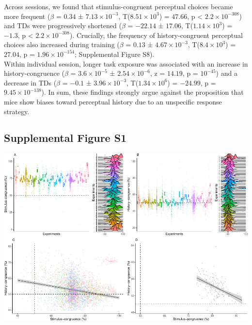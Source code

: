 \documentclass[
]{article}
\begin{document}
Across sessions, we found that stimulus-congruent perceptual choices
became more frequent (\(\beta\) = \(0.34\) ±
\(\ensuremath{7.13\times 10^{-3}}\),
T(\(\ensuremath{8.51\times 10^{3}}\)) = \(47.66\), p < \(\ensuremath{2.2\times 10^{-308}}\)) and TDs
were progressively shortened (\(\beta\) = \(-22.14\) ± \(17.06\),
T(\(\ensuremath{1.14\times 10^{3}}\)) = \(-1.3\), p < \(\ensuremath{2.2\times 10^{-308}}\)). Crucially,
the frequency of history-congruent perceptual choices also increased
during training (\(\beta\) = \(0.13\) ±
\(\ensuremath{4.67\times 10^{-3}}\),
T(\(\ensuremath{8.4\times 10^{3}}\)) = \(27.04\), p =
\(\ensuremath{1.96\times 10^{-154}}\); Supplemental Figure S8).\\
Within individual session, longer task exposure was associated with an
increase in history-congruence (\(\beta\) =
\(\ensuremath{3.6\times 10^{-5}}\) ±
\(\ensuremath{2.54\times 10^{-6}}\), z = \(14.19\), p =
\(\ensuremath{10^{-45}}\)) and a decrease in TDs (\(\beta\) = \(-0.1\) ±
\(\ensuremath{3.96\times 10^{-3}}\),
T(\(\ensuremath{1.34\times 10^{6}}\)) = \(-24.99\), p =
\(\ensuremath{9.45\times 10^{-138}}\)). In sum, these findings strongly
argue against the proposition that mice show biases toward perceptual
history due to an unspecific response strategy.

\newpage

\hypertarget{supplemental-figure-s1}{%
\subsection{Supplemental Figure S1}\label{supplemental-figure-s1}}

\includegraphics{modes_mouse_rev1b_files/figure-latex/Supplemental_Figure_S1-1.pdf}
\end{document}
